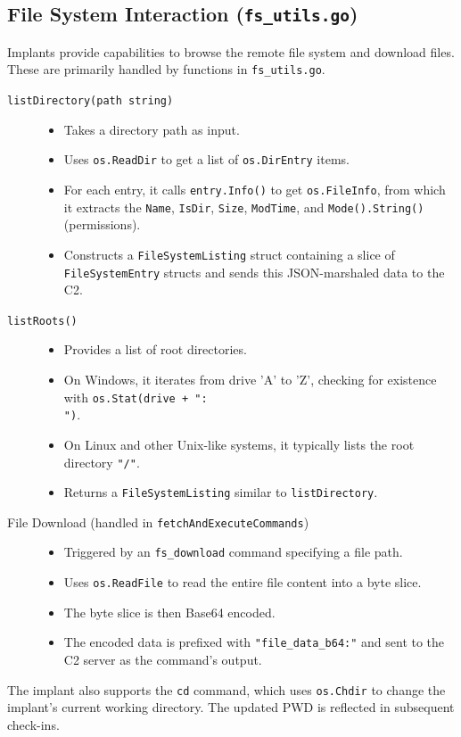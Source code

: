\subsection{File System Interaction (\texttt{fs\_utils.go})}
Implants provide capabilities to browse the remote file system and download files. These are primarily handled by functions in \texttt{fs\_utils.go}.
\begin{description}
    \item[\texttt{listDirectory(path string)}]
        \begin{itemize}
            \item Takes a directory path as input.
            \item Uses \texttt{os.ReadDir} to get a list of \texttt{os.DirEntry} items.
            \item For each entry, it calls \texttt{entry.Info()} to get \texttt{os.FileInfo}, from which it extracts the \texttt{Name}, \texttt{IsDir}, \texttt{Size}, \texttt{ModTime}, and \texttt{Mode().String()} (permissions).
            \item Constructs a \texttt{FileSystemListing} struct containing a slice of \texttt{FileSystemEntry} structs and sends this JSON-marshaled data to the C2.
        \end{itemize}
    \item[\texttt{listRoots()}]
        \begin{itemize}
            \item Provides a list of root directories.
            \item On Windows, it iterates from drive 'A' to 'Z', checking for existence with \texttt{os.Stat(drive + ":\\")}.
            \item On Linux and other Unix-like systems, it typically lists the root directory \texttt{"/"}.
            \item Returns a \texttt{FileSystemListing} similar to \texttt{listDirectory}.
        \end{itemize}
    \item[File Download (handled in \texttt{fetchAndExecuteCommands})]
        \begin{itemize}
            \item Triggered by an \texttt{fs\_download} command specifying a file path.
            \item Uses \texttt{os.ReadFile} to read the entire file content into a byte slice.
            \item The byte slice is then Base64 encoded.
            \item The encoded data is prefixed with \texttt{"file\_data\_b64:"} and sent to the C2 server as the command's output.
        \end{itemize}
\end{description}
The implant also supports the \texttt{cd} command, which uses \texttt{os.Chdir} to change the implant's current working directory. The updated PWD is reflected in subsequent check-ins.

